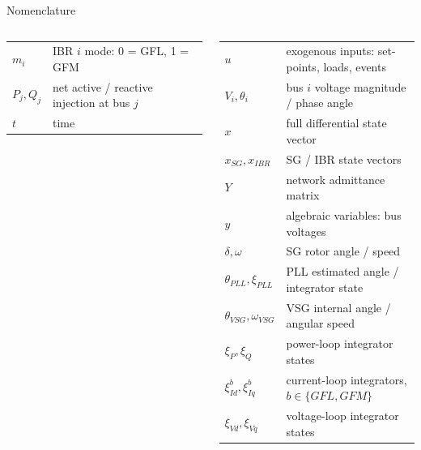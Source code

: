 \documentclass{beamer}
\begin{document}
\begin{frame}{Nomenclature}
\begin{columns}[t,onlytextwidth]
\begin{tabular}{@{}p{1.55cm}>{\raggedright\arraybackslash}p{3.35cm}@{}}
$m_i$ & IBR $i$ mode: 0 = GFL, 1 = GFM\\
$P_j,Q_j$ & net active / reactive injection at bus $j$\\
$t$ & time\\
\end{tabular}
\begin{tabular}{@{}p{1.55cm}>{\raggedright\arraybackslash}p{3.35cm}@{}}
$u$ & exogenous inputs: set-points, loads, events\\
$V_i,\theta_i$ & bus $i$ voltage magnitude / phase angle\\
$x$ & full differential state vector\\
$x_{SG},x_{IBR}$ & SG / IBR state vectors\\
$Y$ & network admittance matrix\\
$y$ & algebraic variables: bus voltages\\
$\delta,\omega$ & SG rotor angle / speed\\
$\theta_{PLL},\xi_{PLL}$ & PLL estimated angle / integrator state\\
$\theta_{VSG},\omega_{VSG}$ & VSG internal angle / angular speed\\
$\xi_P,\xi_Q$ & power-loop integrator states\\
$\xi_{Id}^{b},\xi_{Iq}^{b}$ & current-loop integrators, $b\in\{GFL,GFM\}$\\
$\xi_{Vd},\xi_{Vq}$ & voltage-loop integrator states\\
\end{tabular}
\end{columns}
\end{frame}
\end{document}
